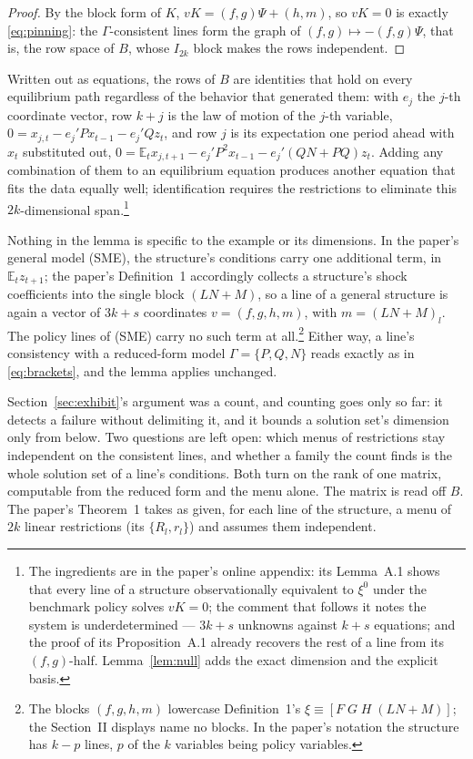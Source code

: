 \documentclass[11pt]{article}
\theoremstyle{remark}
\newcommand{\E}{\mathbb{E}}
\begin{document}
\begin{proof}
By the block form of $K$, $vK=(f,g)\Psi+(h,m)$, so $vK=0$ is exactly \eqref{eq:pinning}: the $\Gamma$-consistent lines form the graph of $(f,g)\mapsto-(f,g)\Psi$, that is, the row space of $B$, whose $I_{2k}$ block makes the rows independent.
\end{proof}

Written out as equations, the rows of $B$ are identities that hold on every equilibrium path regardless of the behavior that generated them: with $e_j$ the $j$-th coordinate vector, row $k+j$ is the law of motion of the $j$-th variable, $0=x_{j,t}-e_j'Px_{t-1}-e_j'Qz_t$, and row $j$ is its expectation one period ahead with $x_t$ substituted out, $0=\E_tx_{j,t+1}-e_j'P^2x_{t-1}-e_j'(QN+PQ)z_t$. Adding any combination of them to an equilibrium equation produces another equation that fits the data equally well; identification requires the restrictions to eliminate this $2k$-dimensional span.\footnote{The ingredients are in the paper's online appendix: its Lemma~A.1 shows that every line of a structure observationally equivalent to $\xi^0$ under the benchmark policy solves $vK=0$; the comment that follows it notes the system is underdetermined --- $3k+s$ unknowns against $k+s$ equations; and the proof of its Proposition~A.1 already recovers the rest of a line from its $(f,g)$-half. Lemma~\ref{lem:null} adds the exact dimension and the explicit basis.}

Nothing in the lemma is specific to the example or its dimensions. In the paper's general model (SME), the structure's conditions carry one additional term, in $\E_tz_{t+1}$; the paper's Definition~1 accordingly collects a structure's shock coefficients into the single block $(LN+M)$, so a line of a general structure is again a vector of $3k+s$ coordinates $v=(f,g,h,m)$, with $m=(LN+M)_l$. The policy lines of (SME) carry no such term at all.\footnote{The blocks $(f,g,h,m)$ lowercase Definition~1's $\xi\equiv[F\;G\;H\;(LN+M)]$; the Section~II displays name no blocks. In the paper's notation the structure has $k-p$ lines, $p$ of the $k$ variables being policy variables.} Either way, a line's consistency with a reduced-form model $\Gamma=\{P,Q,N\}$ reads exactly as in \eqref{eq:brackets}, and the lemma applies unchanged.

Section~\ref{sec:exhibit}'s argument was a count, and counting goes only so far: it detects a failure without delimiting it, and it bounds a solution set's dimension only from below. Two questions are left open: which menus of restrictions stay independent on the consistent lines, and whether a family the count finds is the whole solution set of a line's conditions. Both turn on the rank of one matrix, computable from the reduced form and the menu alone. The matrix is read off $B$. The paper's Theorem~1 takes as given, for each line of the structure, a menu of $2k$ linear restrictions (its $\{R_l,r_l\}$) and assumes them independent.
\end{document}

